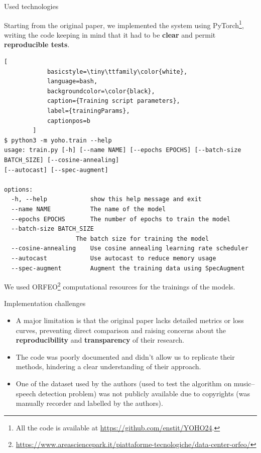 	\begin{frame}[fragile]{Used technologies}
	
		Starting from the original paper, we implemented the system using PyTorch\footnote{All the code is available at
		\url{https://github.com/enstit/YOHO24}.}, writing the code keeping in mind that it had to be \textbf{clear} and
		permit \textbf{reproducible tests}.
		
		\begin{lstlisting}[
			basicstyle=\tiny\ttfamily\color{white},
			language=bash,
			backgroundcolor=\color{black},
			caption={Training script parameters},
			label={trainingParams},
			captionpos=b
		]
$ python3 -m yoho.train --help
usage: train.py [-h] [--name NAME] [--epochs EPOCHS] [--batch-size BATCH_SIZE] [--cosine-annealing]
[--autocast] [--spec-augment]

options:
  -h, --help            show this help message and exit
  --name NAME           The name of the model
  --epochs EPOCHS       The number of epochs to train the model
  --batch-size BATCH_SIZE    
	                The batch size for training the model		  
  --cosine-annealing    Use cosine annealing learning rate scheduler
  --autocast            Use autocast to reduce memory usage
  --spec-augment        Augment the training data using SpecAugment
		\end{lstlisting}

		We used ORFEO\footnote{\url{https://www.areasciencepark.it/piattaforme-tecnologiche/data-center-orfeo/}}
		computational resources for the trainings of the models.
		
	\end{frame}
	
	\begin{frame}{Implementation challenges}

	\begin{itemize}
		\item {A major limitation is that the original paper lacks detailed metrics or loss curves, preventing direct
			comparison and raising concerns about the \textbf{reproducibility} and \textbf{transparency} of their
			research.}
		\item {The code was poorly documented and didn’t allow us to replicate their methods, hindering a clear
			understanding of their approach.}
		\item {One of the dataset used by the authors (used to test the algorithm on music--speech detection problem) was not publicly available due to copyrights (was manually recorder and labelled by the authors).}
	\end{itemize}

	\end{frame}

